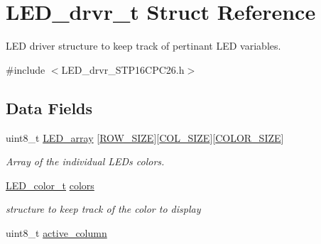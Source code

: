 \hypertarget{struct_l_e_d__drvr__t}{}\section{L\+E\+D\+\_\+drvr\+\_\+t Struct Reference}
\label{struct_l_e_d__drvr__t}


L\+ED driver structure to keep track of pertinant L\+ED variables.  




{\ttfamily \#include $<$L\+E\+D\+\_\+drvr\+\_\+\+S\+T\+P16\+C\+P\+C26.\+h$>$}

\subsection*{Data Fields}
\begin{DoxyCompactItemize}
\item 
\hypertarget{struct_l_e_d__drvr__t_aff6aed840461f5e82af8be24a360ec74}{}\label{struct_l_e_d__drvr__t_aff6aed840461f5e82af8be24a360ec74} 
uint8\+\_\+t \hyperlink{struct_l_e_d__drvr__t_aff6aed840461f5e82af8be24a360ec74}{L\+E\+D\+\_\+array} \mbox{[}\hyperlink{_l_e_d__drvr___s_t_p16_c_p_c26_8h_aa4d030604a90c8d019d90fc721900d63}{R\+O\+W\+\_\+\+S\+I\+ZE}\mbox{]}\mbox{[}\hyperlink{_l_e_d__drvr___s_t_p16_c_p_c26_8h_a99468544016f0abb855e6415c629ec29}{C\+O\+L\+\_\+\+S\+I\+ZE}\mbox{]}\mbox{[}\hyperlink{_l_e_d__drvr___s_t_p16_c_p_c26_8h_a68a80be4e42506b0127b8559bc6662b0}{C\+O\+L\+O\+R\+\_\+\+S\+I\+ZE}\mbox{]}
\begin{DoxyCompactList}\small\item\em Array of the individual L\+E\+Ds colors. \end{DoxyCompactList}\item 
\hypertarget{struct_l_e_d__drvr__t_a6e32e3e7c8896d9fdaf48d6ee869b043}{}\label{struct_l_e_d__drvr__t_a6e32e3e7c8896d9fdaf48d6ee869b043} 
\hyperlink{struct_l_e_d__color__t}{L\+E\+D\+\_\+color\+\_\+t} \hyperlink{struct_l_e_d__drvr__t_a6e32e3e7c8896d9fdaf48d6ee869b043}{colors}
\begin{DoxyCompactList}\small\item\em structure to keep track of the color to display \end{DoxyCompactList}\item 
\hypertarget{struct_l_e_d__drvr__t_a3a2948aab6633f25d9240c3d80083b3a}{}\label{struct_l_e_d__drvr__t_a3a2948aab6633f25d9240c3d80083b3a} 
uint8\+\_\+t \hyperlink{struct_l_e_d__drvr__t_a3a2948aab6633f25d9240c3d80083b3a}{active\+\_\+column}

\end{DoxyCompactItemize}
